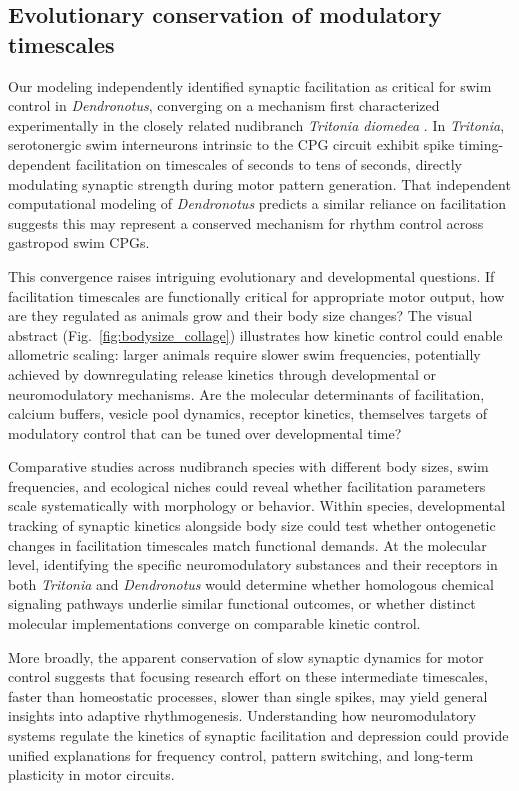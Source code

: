 \documentclass[nofootinbib,aip,amsmath,amssymb,preprint,twocolumn,floatfix,10pt]{revtex4-2}
\begin{document}
\subsection{Evolutionary conservation of modulatory timescales}

Our modeling independently identified synaptic facilitation as critical for swim control in \textit{Dendronotus}, converging on a mechanism first characterized experimentally in the closely related nudibranch \textit{Tritonia diomedea} \cite{katz1994dynamic, sakurai2003spike}. In \textit{Tritonia}, serotonergic swim interneurons intrinsic to the CPG circuit exhibit spike timing-dependent facilitation on timescales of seconds to tens of seconds, directly modulating synaptic strength during motor pattern generation. That independent computational modeling of \textit{Dendronotus} predicts a similar reliance on facilitation suggests this may represent a conserved mechanism for rhythm control across gastropod swim CPGs.

This convergence raises intriguing evolutionary and developmental questions. If facilitation timescales are functionally critical for appropriate motor output, how are they regulated as animals grow and their body size changes? The visual abstract (Fig.~\ref{fig:bodysize_collage}) illustrates how kinetic control could enable allometric scaling: larger animals require slower swim frequencies, potentially achieved by downregulating release kinetics through developmental or neuromodulatory mechanisms. Are the molecular determinants of facilitation, calcium buffers, vesicle pool dynamics, receptor kinetics, themselves targets of modulatory control that can be tuned over developmental time?

Comparative studies across nudibranch species with different body sizes, swim frequencies, and ecological niches could reveal whether facilitation parameters scale systematically with morphology or behavior. Within species, developmental tracking of synaptic kinetics alongside body size could test whether ontogenetic changes in facilitation timescales match functional demands. At the molecular level, identifying the specific neuromodulatory substances and their receptors in both \textit{Tritonia} and \textit{Dendronotus} would determine whether homologous chemical signaling pathways underlie similar functional outcomes, or whether distinct molecular implementations converge on comparable kinetic control.

More broadly, the apparent conservation of slow synaptic dynamics for motor control suggests that focusing research effort on these intermediate timescales, faster than homeostatic processes, slower than single spikes, may yield general insights into adaptive rhythmogenesis. Understanding how neuromodulatory systems regulate the kinetics of synaptic facilitation and depression could provide unified explanations for frequency control, pattern switching, and long-term plasticity in motor circuits.
\end{document}
